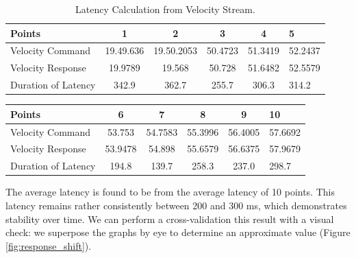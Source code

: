 \begin{table}[!h]
  \raggedright
  \footnotesize%
    \begin{tabular}{lccccl}
      \toprule
      Points  & 1 & 2 & 3 & 4 & 5\\
                                   
      \midrule
      Velocity Command      &  19.49.636& 19.50.2053&  50.4723 & 51.3419 & 52.2437 \\%
      Velocity Response      &   19.9789  & 19.568    &  50.728  & 51.6482 & 52.5579 \\ 
        \midrule
      Duration of Latency        & 342.9  & 362.7    &  255.7 & 306.3 & 314.2   \\ 
      \bottomrule
    \end{tabular}
    \caption{Latency Calculation from Velocity Stream.}
    \label{tab:velocity_latency}
\end{table}
\vspace{2em} 
\begin{table}[!h]
  \raggedright
  \footnotesize%
    \begin{tabular}{lccccl}
      \toprule
      Points  & 6 & 7 & 8 & 9 & 10\\
                                   
      \midrule
      Velocity Command      & 53.753 & 54.7583       & 55.3996 & 56.4005 & 57.6692\\%
      Velocity Response      & 53.9478    & 54.898          & 55.6579 & 56.6375 & 57.9679\\ 
        \midrule
      Duration of Latency        & 194.8 & 139.7               & 258.3 & 237.0 & 298.7\\ 
      \bottomrule
    \end{tabular}
\end{table}

The average latency is found to be  from the average latency of 10 points. This latency remains rather consistently between 200 and 300 ms, which demonstrates stability over time. We can perform a cross-validation this result with a visual check: we superpose the graphs by eye to determine an approximate value (Figure \ref{fig:response_shift}). 


